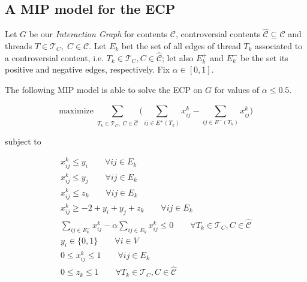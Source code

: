 \subsection{A MIP model for the \acrshort{ECP}}%
\label{sub:a_mip_model_for_the_ecp}

Let $G$ be our \emph{Interaction Graph} for contents $\mathcal{C} $,
controversial contents $\mathcal{\hat{C}} \subseteq \mathcal{C} $ and
threads $T \in \mathcal{T}_{C}, \; C \in \mathcal{C} $. Let $E_k$ bet the set
of all edges of thread $T_k$ associated to a controversial content, i.e. $T_{k}
	\in \mathcal{T}_{C}, C \in \mathcal{\hat{C}}$; let also $E^{+}_k $
and $E^{-}_k $ be the set its positive and negative edges, respectively. Fix $\alpha \in [0, 1]$.

The following \acrshort{MIP} model is able to solve the \acrshort{ECP} on $G$
for values of $\alpha \leq 0.5$.

\begin{equation}
	\label{eq:ecp-exact1}
	\text{maximize} \; \sum_{ T_{k} \in \mathcal{T}_{C}, \; C \in
		\mathcal{\hat{C}} } \big( \sum^{}_{ij \in E^{+} (T_{k})} x_{ij}
		^{k} - \sum_{ij \in E^{-} (T_{k})} x_{ij} ^{k} \big)
\end{equation} \begin{center} subject to \end{center}
\begin{gather}
	\label{eq:ecp-v1}
	x _{ij}^{k}  \leq y_i \quad\quad \forall ij \in E_k  \\
	\label{eq:ecp-v2}
	x _{ij}^{k}  \leq y_j \quad\quad \forall ij \in E_k \\
	\label{eq:ecp-t1}
	x _{ij}^{k}  \leq z_k \quad\quad \forall ij \in E_k \\
	\label{eq:ecp-e1}
	x _{ij} ^{k} \geq - 2 + y_i + y_j + z_k \quad\quad \forall ij \in E_k \\
	\label{eq:ecp-alpha-constraint1}
	\sum^{}_{ij \in E_k^{-} } x_{ij}^{k}  - \alpha \sum^{}_{ij \in E_k}
	x_{ij} ^{k}  \leq 0 \quad\quad \forall T_{k} \in \mathcal{T} _{C}, C \in
	\hat{\mathcal{C}} \\
	\label{eq:ecp-vertex-def1}
	y _{i} \in  \{0, 1\} \quad\quad \forall i \in V \\
	\label{eq:ecp-edge-def1}
	0 \leq x _{ij} ^{k}  \leq 1 \quad\quad \forall ij \in E_k \\
	\label{eq:ecp-thread-def1}
	0 \leq z _{k} \leq 1 \quad\quad \forall T_{k} \in \mathcal{T} _{C}, C \in
	\hat{\mathcal{C}}
\end{gather}


